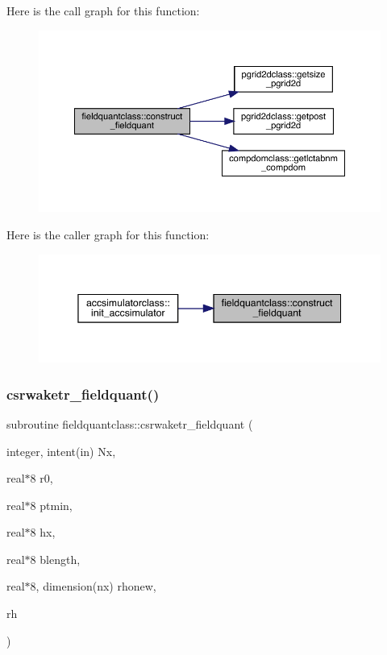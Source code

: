 Here is the call graph for this function\+:\nopagebreak
\begin{figure}[H]
\begin{center}
\leavevmode
\includegraphics[width=350pt]{namespacefieldquantclass_a02f323941fc76278b26a3aa06fa3bbdd_cgraph}
\end{center}
\end{figure}
Here is the caller graph for this function\+:\nopagebreak
\begin{figure}[H]
\begin{center}
\leavevmode
\includegraphics[width=345pt]{namespacefieldquantclass_a02f323941fc76278b26a3aa06fa3bbdd_icgraph}
\end{center}
\end{figure}
\mbox{\label{namespacefieldquantclass_a773b62d57c290818337131902b979b43}} 
\subsubsection{\texorpdfstring{csrwaketr\_fieldquant()}{csrwaketr\_fieldquant()}}
{\footnotesize\ttfamily subroutine fieldquantclass\+::csrwaketr\+\_\+fieldquant (\begin{DoxyParamCaption}\item[{integer, intent(in)}]{Nx,  }\item[{real$\ast$8}]{r0,  }\item[{real$\ast$8}]{ptmin,  }\item[{real$\ast$8}]{hx,  }\item[{real$\ast$8}]{blength,  }\item[{real$\ast$8, dimension(nx)}]{rhonew,  }\item[{}]{rh }\end{DoxyParamCaption})}



